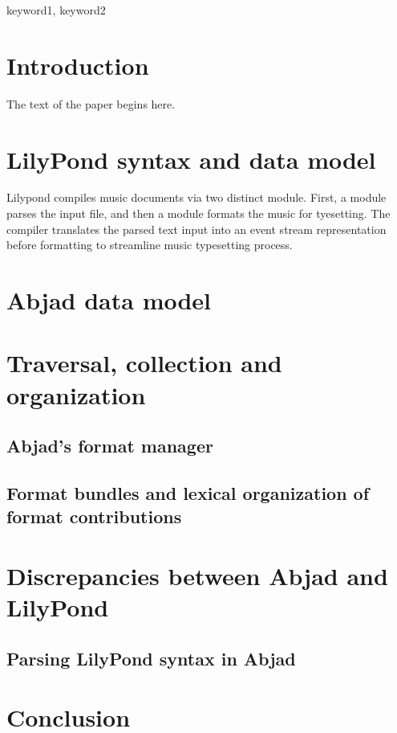 \documentclass{sigplanconf}
\begin{document}
\keywords
keyword1, keyword2

\section{Introduction}

The text of the paper begins here.

\section{LilyPond syntax and data model}
Lilypond compiles music documents via two distinct module. First, a module parses the input
file, and then a module formats the music for tyesetting. The compiler translates the parsed text input into an event stream representation before formatting to streamline music typesetting process.\cite{sandberg2006separating}

\section{Abjad data model}

\section{Traversal, collection and organization}

\subsection{Abjad's format manager}

\subsection{Format bundles and lexical organization of format contributions}

\section{Discrepancies between Abjad and LilyPond}

\subsection{Parsing LilyPond syntax in Abjad}

\section{Conclusion}
\end{document}
